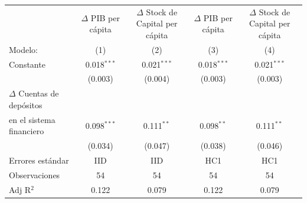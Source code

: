\begingroup
\centering
\begin{tabular}{lcccc}
   \tabularnewline \midrule \midrule
                                             & $\Delta$ PIB per cápita  & \makecell{$\Delta$ Stock de Capital \\per cápita}     & $\Delta$ PIB per cápita  & \makecell{$\Delta$ Stock de Capital \\per cápita}\\      
   Modelo:                                                       & (1)                      & (2)                                                   & (3)                      & (4)\\  
   \midrule
 
   Constante                                                     & 0.018$^{***}$            & 0.021$^{***}$                                         & 0.018$^{***}$            & 0.021$^{***}$\\   
                                                                & (0.003)                  & (0.004)                                               & (0.003)                  & (0.003)\\   
   $\Delta$ Cuentas de depósitos \\ en el sistema financiero    & 0.098$^{***}$            & 0.111$^{**}$                                          & 0.098$^{**}$             & 0.111$^{**}$\\   
                                                                & (0.034)                  & (0.047)                                               & (0.038)                  & (0.046)\\   
   \midrule
Errores estándar & IID & IID & HC1 & HC1 \\
   Observaciones                                                 & 54                       & 54                                                    & 54                       & 54\\  
   Adj R$^2$                                               & 0.122                    & 0.079                                                 & 0.122                    & 0.079\\  
   \midrule \midrule
\end{tabular}
\par\endgroup
